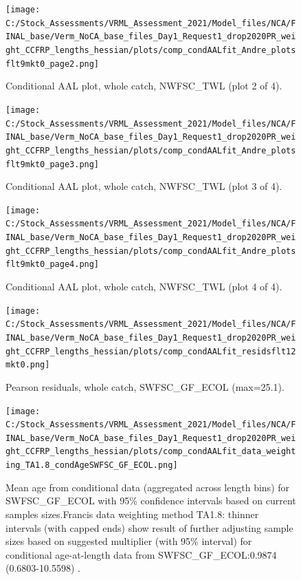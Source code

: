 \documentclass[
  english,
  a4paper,
]{article}
\begin{document}
\begin{figure}
\centering
\texttt{[image: C:/Stock\_Assessments/VRML\_Assessment\_2021/Model\_files/NCA/FINAL\_base/Verm\_NoCA\_base\_files\_Day1\_Request1\_drop2020PR\_weight\_CCFRP\_lengths\_hessian/plots/comp\_condAALfit\_Andre\_plotsflt9mkt0\_page2.png]}
\caption{Conditional AAL plot, whole catch, NWFSC\_TWL (plot 2 of 4).\label{fig:comp_condAALfit_Andre_plotsflt9mkt0_page2}}
\end{figure}

\begin{figure}
\centering
\texttt{[image: C:/Stock\_Assessments/VRML\_Assessment\_2021/Model\_files/NCA/FINAL\_base/Verm\_NoCA\_base\_files\_Day1\_Request1\_drop2020PR\_weight\_CCFRP\_lengths\_hessian/plots/comp\_condAALfit\_Andre\_plotsflt9mkt0\_page3.png]}
\caption{Conditional AAL plot, whole catch, NWFSC\_TWL (plot 3 of 4).\label{fig:comp_condAALfit_Andre_plotsflt9mkt0_page3}}
\end{figure}

\begin{figure}
\centering
\texttt{[image: C:/Stock\_Assessments/VRML\_Assessment\_2021/Model\_files/NCA/FINAL\_base/Verm\_NoCA\_base\_files\_Day1\_Request1\_drop2020PR\_weight\_CCFRP\_lengths\_hessian/plots/comp\_condAALfit\_Andre\_plotsflt9mkt0\_page4.png]}
\caption{Conditional AAL plot, whole catch, NWFSC\_TWL (plot 4 of 4).\label{fig:comp_condAALfit_Andre_plotsflt9mkt0_page4}}
\end{figure}

\begin{figure}
\centering
\texttt{[image: C:/Stock\_Assessments/VRML\_Assessment\_2021/Model\_files/NCA/FINAL\_base/Verm\_NoCA\_base\_files\_Day1\_Request1\_drop2020PR\_weight\_CCFRP\_lengths\_hessian/plots/comp\_condAALfit\_residsflt12mkt0.png]}
\caption{Pearson residuals, whole catch, SWFSC\_GF\_ECOL (max=25.1).\label{fig:comp_condAALfit_residsflt12mkt0}}
\end{figure}

\begin{figure}
\centering
\texttt{[image: C:/Stock\_Assessments/VRML\_Assessment\_2021/Model\_files/NCA/FINAL\_base/Verm\_NoCA\_base\_files\_Day1\_Request1\_drop2020PR\_weight\_CCFRP\_lengths\_hessian/plots/comp\_condAALfit\_data\_weighting\_TA1.8\_condAgeSWFSC\_GF\_ECOL.png]}
\caption{Mean age from conditional data (aggregated across length bins) for SWFSC\_GF\_ECOL with 95\% confidence intervals based on current samples sizes.Francis data weighting method TA1.8: thinner intervals (with capped ends) show result of further adjusting sample sizes based on suggested multiplier (with 95\% interval) for conditional age-at-length data from SWFSC\_GF\_ECOL:0.9874 (0.6803-10.5598) .\label{fig:comp_condAALfit_data_weighting_TA1.8_condAgeSWFSC_GF_ECOL}}
\end{figure}
\end{document}

